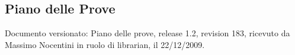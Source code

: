 \subsection{Piano delle Prove}
Documento versionato: Piano delle prove, release 1.2, revision 183, ricevuto da
Massimo Nocentini in ruolo di librarian, il 22/12/2009.